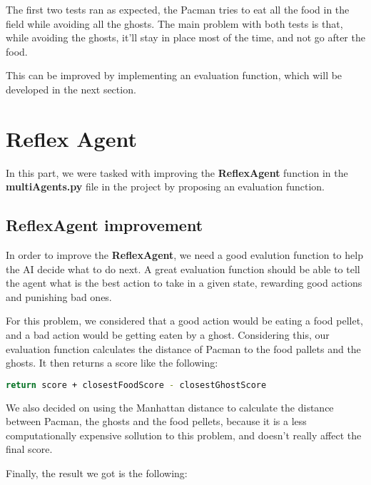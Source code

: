 \documentclass{article}
\begin{document}
The first two tests ran as expected, the Pacman tries to eat all the food in the field while avoiding all the ghosts. The main problem with both tests is that, while avoiding the ghosts, it'll stay in place most of the time, and not go after the food.

This can be improved by implementing an evaluation function, which will be developed in the next section.

\pagebreak
\section{Reflex Agent}

In this part, we were tasked with improving the \textbf{ReflexAgent} function in the \textbf{multiAgents.py} file in the project by proposing an evaluation function.

\subsection{ReflexAgent improvement}

In order to improve the \textbf{ReflexAgent}, we need a good evalution function to help the AI decide what to do next. A great evaluation function should be able to tell the agent what is the best action to take in a given state, rewarding good actions and punishing bad ones.

For this problem, we considered that a good action would be eating a food pellet, and a bad action would be getting eaten by a ghost. Considering this, our evaluation function calculates the distance of Pacman to the food pallets and the ghosts. It then returns a score like the following:

\hbox{}

\begin{lstlisting}[language=bash, frame=tlbr, framesep=6pt, backgroundcolor=\color{light-gray}]
    return score + closestFoodScore - closestGhostScore
\end{lstlisting}

\hbox{}

We also decided on using the Manhattan distance to calculate the distance between Pacman, the ghosts and the food pellets, because it is a less computationally expensive sollution to this problem, and doesn't really affect the final score.

\hbox{}

Finally, the result we got is the following:

\hbox{}
\end{document}
